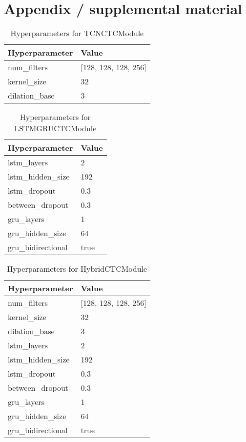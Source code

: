 
\appendix

\section{Appendix / supplemental material}

\begin{table}
    \caption{Hyperparameters for TCNCTCModule}
    \label{tab:tcn_ctc}
    \centering
    \begin{tabular}{ll}
      \toprule
      \textbf{Hyperparameter} & \textbf{Value} \\
      \midrule
      num\_filters & [128, 128, 128, 256] \\
      kernel\_size & 32 \\
      dilation\_base & 3 \\
      \bottomrule
    \end{tabular}
    \label{tab:tcn_hyperparameters}
\end{table}


\begin{table}
    \caption{Hyperparameters for LSTMGRUCTCModule}
    \label{tab:lstm_gru_ctc}
    \centering
    \begin{tabular}{ll}
      \toprule
      \textbf{Hyperparameter} & \textbf{Value} \\
      \midrule
      lstm\_layers & 2 \\
      lstm\_hidden\_size & 192 \\
      lstm\_dropout & 0.3 \\
      between\_dropout & 0.3 \\
      gru\_layers & 1 \\
      gru\_hidden\_size & 64 \\
      gru\_bidirectional & true \\
      \bottomrule
    \end{tabular}
    \label{tab:lstm_gru_hyperparameters}
\end{table}

\begin{table}
    \caption{Hyperparameters for HybridCTCModule}
    \label{tab:hybrid_ctc}
    \centering
    \begin{tabular}{ll}
      \toprule
      \textbf{Hyperparameter} & \textbf{Value} \\
      \midrule
      num\_filters & [128, 128, 128, 256] \\
      kernel\_size & 32 \\
      dilation\_base & 3 \\
      lstm\_layers & 2 \\
      lstm\_hidden\_size & 192 \\
      lstm\_dropout & 0.3 \\
      between\_dropout & 0.3 \\
      gru\_layers & 1 \\
      gru\_hidden\_size & 64 \\
      gru\_bidirectional & true \\
      \bottomrule
    \end{tabular}
    \label{tab:hybrid_hyperparameters}
\end{table}